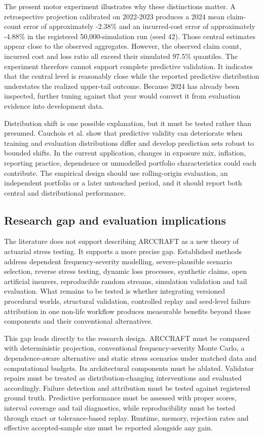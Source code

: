 The present motor experiment illustrates why these distinctions matter. A retrospective projection calibrated on 2022-2023 produces a 2024 mean claim-count error of approximately -2.38\% and an incurred-cost error of approximately -4.88\% in the registered 50,000-simulation run (seed 42). Those central estimates appear close to the observed aggregates. However, the observed claim count, incurred cost and loss ratio all exceed their simulated 97.5\% quantiles. The experiment therefore cannot support complete predictive validation. It indicates that the central level is reasonably close while the reported predictive distribution understates the realized upper-tail outcome. Because 2024 has already been inspected, further tuning against that year would convert it from evaluation evidence into development data.

Distribution shift is one possible explanation, but it must be tested rather than presumed. Cauchois et al. \cite{Cauchois2024} show that predictive validity can deteriorate when training and evaluation distributions differ and develop prediction sets robust to bounded shifts. In the current application, changes in exposure mix, inflation, reporting practice, dependence or unmodelled portfolio characteristics could each contribute. The empirical design should use rolling-origin evaluation, an independent portfolio or a later untouched period, and it should report both central and distributional performance.

\subsection{Research gap and evaluation implications}\label{sec:research-gap-and-evaluation-implications}

The literature does not support describing ARCCRAFT as a new theory of actuarial stress testing. It supports a more precise gap. Established methods address dependent frequency-severity modelling, severe-plausible scenario selection, reverse stress testing, dynamic loss processes, synthetic claims, open artificial insurers, reproducible random streams, simulation validation and tail evaluation. What remains to be tested is whether integrating versioned procedural worlds, structural validation, controlled replay and seed-level failure attribution in one non-life workflow produces measurable benefits beyond those components and their conventional alternatives.

This gap leads directly to the research design. ARCCRAFT must be compared with deterministic projection, conventional frequency-severity Monte Carlo, a dependence-aware alternative and static stress scenarios under matched data and computational budgets. Its architectural components must be ablated. Validator repairs must be treated as distribution-changing interventions and evaluated accordingly. Failure detection and attribution must be tested against registered ground truth. Predictive performance must be assessed with proper scores, interval coverage and tail diagnostics, while reproducibility must be tested through exact or tolerance-based replay. Runtime, memory, rejection rates and effective accepted-sample size must be reported alongside any gain.


